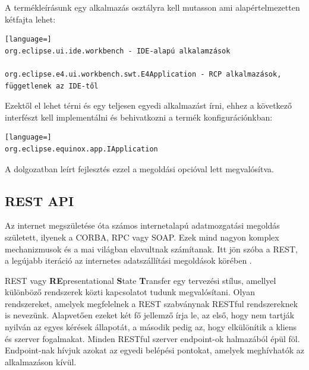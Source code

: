 A termékleírásunk egy alkalmazás osztályra kell mutasson ami alapértelmezetten kétfajta lehet:

\begin{lstlisting}[language=]
org.eclipse.ui.ide.workbench - IDE-alapú alkalamzások

org.eclipse.e4.ui.workbench.swt.E4Application - RCP alkalmazások, függetlenek az IDE-től
\end{lstlisting}

Ezektől el lehet térni és egy teljesen egyedi alkalmazást írni, ehhez a következő interfészt kell implementálni és behivatkozni a termék konfigurációnkban:

\begin{lstlisting}[language=]
org.eclipse.equinox.app.IApplication
\end{lstlisting}

A dolgozatban leírt fejlesztés ezzel a megoldási opcióval lett megvalósítva.

\subsection{REST API}

Az internet megszületése óta számos internetalapú adatmozgatási megoldás született, ilyenek a CORBA, RPC vagy SOAP. Ezek mind nagyon komplex mechanizmusok és a mai világban elavultnak számítanak. Itt jön szóba a REST, a legújabb iteráció az internetes adatszállítási megoldások körében \cite{rest_history}.

REST vagy \textbf{RE}presentational \textbf{S}tate \textbf{T}ransfer egy tervezési stílus, amellyel különböző rendszerek közti kapcsolatot tudunk megvalósítani. Olyan rendszereket, amelyek megfelelnek a REST szabványnak RESTful rendszereknek is nevezünk. Alapvetően ezeket két fő jellemző írja le, az első, hogy nem tartják nyilván az egyes kérések állapotát, a második pedig az, hogy elkülönítik a kliens és szerver fogalmakat. Minden RESTful szerver endpoint-ok halmazából épül föl. Endpoint-nak hívjuk azokat az egyedi belépési pontokat, amelyek meghívhatók az alkalmazáson kívül.

